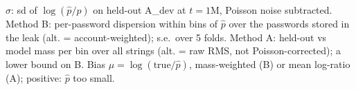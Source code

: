 $\hat\sigma$: sd of $\log(\hat p/p)$ on held-out A\_dev at $t=1$M, Poisson noise subtracted. Method B: per-password dispersion within bins of $\hat p$ over the passwords stored in the leak (alt. = account-weighted); s.e.\ over 5 folds. Method A: held-out vs model mass per bin over all strings (alt. = raw RMS, not Poisson-corrected); a lower bound on B. Bias $\mu=\log(\text{true}/\hat p)$, mass-weighted (B) or mean log-ratio (A); positive: $\hat p$ too small.
